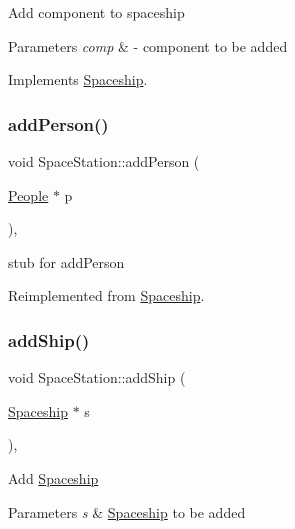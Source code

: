 Add component to spaceship 
\begin{DoxyParams}{Parameters}
{\em comp} & -\/ component to be added \\
\hline
\end{DoxyParams}


Implements \hyperlink{classSpaceship_ac1b4673a691cd100708ddea08cd9f192}{Spaceship}.

\mbox{\label{classSpaceStation_a46146c02fcd8107eda2972cc5843afd8}} 
\subsubsection{\texorpdfstring{add\+Person()}{addPerson()}}
{\footnotesize\ttfamily void Space\+Station\+::add\+Person (\begin{DoxyParamCaption}\item[{\hyperlink{classPeople}{People} $\ast$}]{p }\end{DoxyParamCaption})\hspace{0.3cm}{\ttfamily [inline]}, {\ttfamily [virtual]}}

stub for add\+Person 

Reimplemented from \hyperlink{classSpaceship_add8d9c6dfd5f6ecb8399e41e71e5b22f}{Spaceship}.

\mbox{\label{classSpaceStation_ace2d37733fa5af9551aba31bc9229ad3}} 
\subsubsection{\texorpdfstring{add\+Ship()}{addShip()}}
{\footnotesize\ttfamily void Space\+Station\+::add\+Ship (\begin{DoxyParamCaption}\item[{\hyperlink{classSpaceship}{Spaceship} $\ast$}]{s }\end{DoxyParamCaption})\hspace{0.3cm}{\ttfamily [inline]}, {\ttfamily [virtual]}}

Add \hyperlink{classSpaceship}{Spaceship} 
\begin{DoxyParams}{Parameters}
{\em s} & \hyperlink{classSpaceship}{Spaceship} to be added \\
\hline
\end{DoxyParams}


